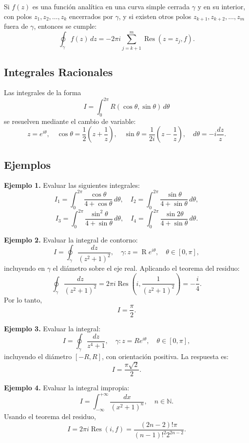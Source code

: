 \documentclass[a4paper,12pt]{article}
\begin{document}
Si $f(z)$ es una función analítica en una curva simple cerrada $\gamma$ y en su interior, con polos $z_{1}, z_{2}, \dots, z_{k}$ encerrados por $\gamma$, y si existen otros polos $z_{k+1}, z_{k+2}, \dots, z_{m}$ fuera de $\gamma$, entonces se cumple:
\[
\oint_{\gamma} f(z) \, dz = -2 \pi i \sum_{j=k+1}^{m} \operatorname{Res}(z = z_{j}, f).
\]

\subsection{Integrales Racionales}

Las integrales de la forma
\[
I = \int_{0}^{2\pi} R(\cos \theta, \sin \theta) \, d\theta
\]
se resuelven mediante el cambio de variable:
\[
 z = e^{i \theta}, \quad \cos \theta = \frac{1}{2} \left( z + \frac{1}{z} \right), \quad \sin \theta = \frac{1}{2i} \left( z - \frac{1}{z} \right), \quad d\theta = -i \frac{dz}{z}.
\]

\subsection*{Ejemplos}

\textbf{Ejemplo 1.} Evaluar las siguientes integrales:
\[
I_1 = \int_{0}^{2 \pi} \frac{\cos \theta}{4 + \cos \theta} \, d \theta, \quad
I_2 = \int_{0}^{2 \pi} \frac{\sin \theta}{4 + \sin \theta} \, d \theta,
\]
\[
I_3 = \int_{0}^{2 \pi} \frac{\sin^2 \theta}{4 + \sin \theta} \, d \theta, \quad
I_4 = \int_{0}^{2 \pi} \frac{\sin 2\theta}{4 + \sin \theta} \, d \theta.
\]

\textbf{Ejemplo 2.} Evaluar la integral de contorno:
\[
I = \oint_{\gamma} \frac{dz}{(z^2 + 1)^2}, \quad \gamma: z = \operatorname{R} e^{i \theta}, \quad \theta \in [0, \pi],
\]
incluyendo en $\gamma$ el diámetro sobre el eje real. Aplicando el teorema del residuo:
\[
\oint_{\gamma} \frac{dz}{(z^2 + 1)^2} = 2\pi i \operatorname{Res} \left( i, \frac{1}{(z^2 + 1)^2} \right) = -\frac{i}{4}.
\]
Por lo tanto,
\[
I = \frac{\pi}{2}.
\]

\textbf{Ejemplo 3.} Evaluar la integral:
\[
I = \oint_{\gamma} \frac{dz}{z^4 + 1}, \quad \gamma: z = R e^{i \theta}, \quad \theta \in [0, \pi],
\]
incluyendo el diámetro $[-R, R]$, con orientación positiva. La respuesta es:
\[
I = \frac{\pi \sqrt{2}}{2}.
\]

\textbf{Ejemplo 4.} Evaluar la integral impropia:
\[
I = \int_{-\infty}^{+\infty} \frac{dx}{(x^2 + 1)^n}, \quad n \in \mathbb{N}.
\]
Usando el teorema del residuo,
\[
I = 2 \pi i \operatorname{Res}(i, f) = \frac{(2n - 2)! \pi}{(n-1)!^2 2^{2n - 2}}.
\]
\end{document}
